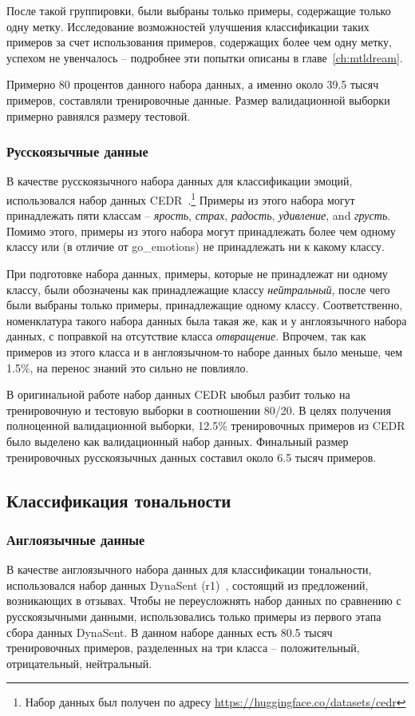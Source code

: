 После такой группировки, были выбраны только примеры, содержащие только одну метку. Исследование возможностей улучшения классификации таких примеров за счет использования примеров, содержащих более чем одну метку, успехом не увенчалось -- подробнее эти попытки описаны в главе~\ref{ch:mtldream}. 

Примерно 80 процентов данного набора данных, а именно около 39.5 тысяч примеров, составляли тренировочные данные. Размер валидационной выборки примерно равнялся размеру тестовой. 

\subsubsection{Русскоязычные данные}
В качестве русскоязычного набора данных для классификации эмоций, использовался набор данных {CEDR}~\cite{ru_emotions}.\footnote{Набор данных был получен по адресу \url{https://huggingface.co/datasets/cedr}} Примеры из этого набора могут принадлежать пяти классам -- \textit{ярость}, \textit{страх}, \textit{радость}, \textit{удивление}, and \textit{грусть}. Помимо этого, примеры из этого набора могут принадлежать более чем одному классу или (в отличие от {go\_emotions}) не принадлежать ни к какому классу.

При подготовке набора данных, примеры, которые не принадлежат ни одному классу, были обозначены как принадлежащие классу \textit{нейтральный}, после чего были выбраны только примеры, принадлежащие одному классу. Соответственно, номенклатура такого набора данных была такая же, как и у англоязычного набора данных, с поправкой на отсутствие класса \textit{отвращение}. Впрочем, так как примеров из этого класса и в англоязычном-то наборе данных было меньше, чем 1.5\%, на перенос знаний это сильно не повлияло. 

В оригинальной работе набор данных CEDR ыюбыл разбит только на тренировочную и тестовую выборки в соотношении 80/20. В целях получения полноценной валидационной выборки, 12.5\% тренировочных примеров из CEDR было выделено как валидационный набор данных. Финальный размер тренировочных русскоязычных данных составил около 6.5 тысяч примеров.


\subsection{Классификация тональности}

\subsubsection{Англоязычные данные} 
В качестве англоязычного набора данных для классификации тональности, использовался набор данных {DynaSent} (r1)~\cite{sentiment}, состоящий из предложений, возникающих в отзывах. Чтобы не переусложнять набор данных по сравнению с русскоязычными данными, использовались только примеры из первого этапа сбора данных DynaSent. В данном наборе данных есть 80.5 тысяч тренировочных примеров, разделенных на три класса -- положительный, отрицательный, нейтральный.

